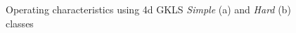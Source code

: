 \documentclass[runningheads]{llncs}
\begin{document}
\begin{figure}
\begin{minipage}{0.5\linewidth}
\end{minipage}
\begin{minipage}{0.5\linewidth}
\end{minipage}
\caption{Operating characteristics using 4d GKLS \textit{Simple} (a) and \textit{Hard} (b) classes}
\label{fig3}
\end{figure}
\end{document}
